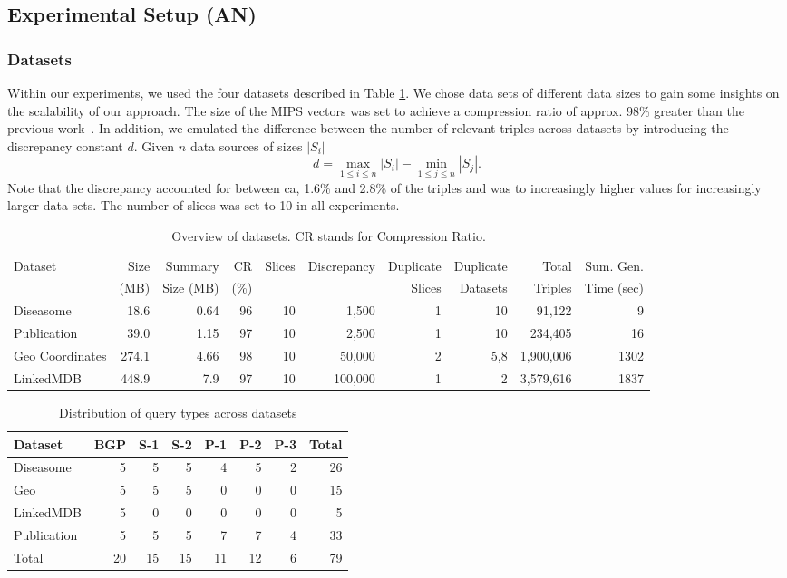 \documentclass{sig-alternate}  %
\begin{document}
\subsection{Experimental Setup (AN)}
\subsubsection{Datasets}
Within our experiments, we used the four datasets described in Table \ref{tab:datasets}.
We chose data sets of different data sizes to gain some insights on the scalability of our approach.
The size of the MIPS vectors was set to achieve a compression ratio of approx. 98\% greater than the previous work~\cite{key-5}.
In addition, we emulated the difference between the number of relevant triples across datasets by introducing the discrepancy constant $d$.
Given $n$ data sources of sizes $|S_i|$
\begin{equation}
d = \max\limits_{1 \leq i \leq n} |S_i| - \min\limits_{1 \leq j \leq n} |S_j|.
\end{equation}
Note that the discrepancy accounted for between ca, 1.6\% and 2.8\% of the triples and was to increasingly higher values for increasingly larger data sets.
The number of slices was set to 10 in all experiments.
\begin{table}
\centering
\begin{tabular}{lrrrrrrrrr}
\hline
Dataset & Size  & Summary 	& CR   & Slices & Discrepancy & Duplicate  & Duplicate & Total 	& Sum. Gen. \\
				& (MB) 	& Size (MB) & (\%) &	  		 &  					 & Slices 		& Datasets 	& Triples & Time (sec)\\
\hline
Diseasome 			& 18.6 	& 0.64 	& 96 & 10 & 1,500 		& 1 & 10 			& 91,122 & 9\\
Publication 						& 39.0	& 1.15 	& 97 & 10 & 2,500 		& 1 & 10 			& 234,405 & 16\\
Geo Coordinates & 274.1 & 4.66 	& 98 & 10 & 50,000 	& 2 & 5,8				& 1,900,006 & 1302\\
LinkedMDB 			& 448.9 & 7.9 	& 97 & 10 & 100,000 	& 1 & 2 			& 3,579,616 & 1837\\
\hline
\end{tabular}
\caption{Overview of datasets. CR stands for Compression Ratio.}
\label{tab:datasets}
\end{table}

\begin{table}
\centering
\begin{tabular}{lrrrrrrr}
\hline
Dataset 		& BGP  & S-1 & S-2 & P-1 & P-2 & P-3 & Total \\\hline
Diseasome 			& 5 & 5 & 5 & 4 & 5 & 2 & 26 \\
Geo  & 5 & 5 & 5 & 0 & 0 & 0 & 15 \\
LinkedMDB 			& 5 & 0 & 0 & 0 & 0 & 0 & 5 \\
Publication 		& 5 & 5 & 5 & 7 & 7 & 4 & 33 \\\hline
Total 					& 20 & 15 & 15 & 11 & 12 & 6 & 79\\
\hline
\end{tabular}
\caption{Distribution of query types across datasets}
\label{tab:queries}
\end{table}
\end{document}
